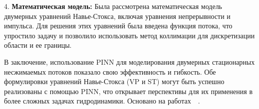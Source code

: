 \documentclass[a4paper,12pt]{article}
\theoremstyle{plain} %
\theoremstyle{definition} %
\theoremstyle{remark} %
\begin{document}
4. \textbf{Математическая модель:} Была рассмотрена математическая модель двумерных уравнений Навье-Стокса, включая уравнения непрерывности и импульса. Для решения этих уравнений была введена функция потока, что упростило задачу и позволило использовать метод коллимации для дискретизации области и ее границы.

В заключение, использование PINN для моделирования двумерных стационарных несжимаемых потоков показало свою эффективность и гибкость. Обе формулировки уравнений Навье-Стокса (VP и ST) могут быть успешно реализованы с помощью PINN, что открывает перспективы для их применения в более сложных задачах гидродинамики.
Основано на работах~\cite{baymani2015artificial}~\cite{amalinadhi2022physics}.




\end{document}
